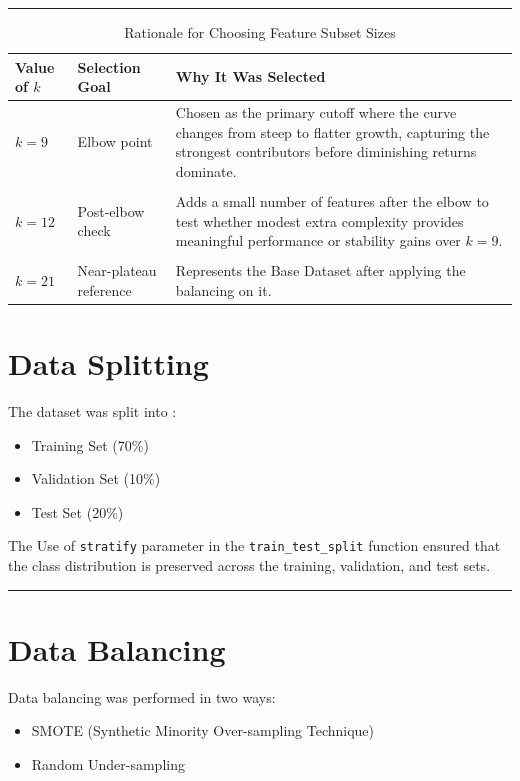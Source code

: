\documentclass[12pt,a4paper]{report}
\begin{document}
\vspace{1cm}
\hrule
\vspace{1cm}
\begin{table}[H]
    \centering
    \caption{Rationale for Choosing Feature Subset Sizes}
    \label{tab:k-selection-rationale}
    \begin{tabular}{p{} p{} p{}}
        \toprule
        \textbf{Value of \(k\)} & \textbf{Selection Goal} & \textbf{Why It Was Selected} \\
        \midrule
        \(k=9\) & Elbow point & Chosen as the primary cutoff where the curve changes from steep to flatter growth, capturing the strongest contributors before diminishing returns dominate. \\ \\
        \(k=12\) & Post-elbow check & Adds a small number of features after the elbow to test whether modest extra complexity provides meaningful performance or stability gains over \(k=9\). \\ \\
        \(k=21\) & Near-plateau reference & Represents the Base Dataset after applying the balancing on it. \\
        \bottomrule
    \end{tabular}
\end{table}

\newpage

\section{Data Splitting}
The dataset was split into :
\begin{itemize}
    \item Training Set (70\%)
    \item Validation Set (10\%)
    \item Test Set (20\%)
\end{itemize}
The Use of \texttt{stratify} parameter in the \texttt{train\_test\_split} function ensured that the class distribution is preserved across the training, validation, and test sets.

\vspace{1 cm}
\hrule
\vspace{1 cm}

\section{Data Balancing}
Data balancing was performed in two ways:
\begin{itemize}
    \item SMOTE (Synthetic Minority Over-sampling Technique)
    \item Random Under-sampling
\end{itemize}
\end{document}
